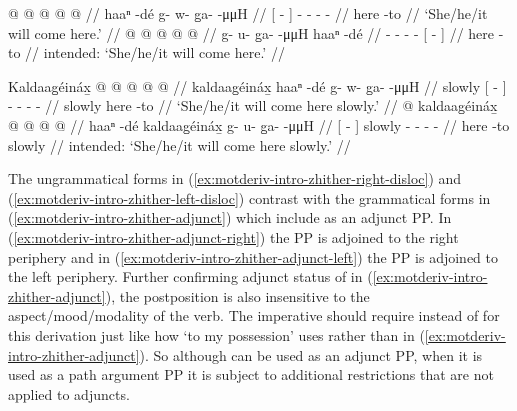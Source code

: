 \documentclass[12pt,letterpaper,oneside,article]{memoir}
\begin{document}
\pex\label{ex:motderiv-intro-zhither-right}%
\a\label{ex:motderiv-intro-zhither-right-insitu}%
%
\begingl
	\gla	{}  @ {} {}
		 @ {} @ {} @ {} @ {} //
	\glb	{} haaⁿ -dé {}
		g- w- g̱a-  -μμH //
	\glc	{}[  - {}]
		- - -  - //
	\gld	{} here -to {}
		 {} {} {} {} //
	\glft	‘She/he/it will come here.’
		//
\endgl
\a\label{ex:motderiv-intro-zhither-right-disloc}%
\ljudge{*}%
%
\begingl
	\gla	{} @ {} @ {} @ {} @ {}
		{}  @ {} {} //
	\glb	g- u- g̱a-  -μμH
		{} haaⁿ -dé {} //
	\glc	{}- - -  -
		{}[  - {}] //
	\gld	{} {} {} {} {}
		{} here -to {} //
	\glft	intended: ‘She/he/it will come here.’
		//
\endgl
\xe

\pex\label{ex:motderiv-intro-zhither-left}%
\a\label{ex:motderiv-intro-zhither-left-insitu}%
%
\begingl
	\gla	Kaldaag̱éináx̱
		{}  @ {} {}
		 @ {} @ {} @ {} @ {} //
	\glb	kaldaag̱éináx̱
		{} haaⁿ -dé {}
		g- w- g̱a-  -μμH //
	\glc	slowly
		{}[  - {}]
		- - -  - //
	\gld	slowly
		{} here -to {}
		 {} {} {} {} //
	\glft	‘She/he/it will come here slowly.’
		//
\endgl
\a\label{ex:motderiv-intro-zhither-left-disloc}%
\ljudge{*}%
%
\begingl
	\gla	{}  @ {} {}
		kaldaag̱éináx̱
		 @ {} @ {} @ {} @ {} //
	\glb	{} haaⁿ -dé {}
		kaldaag̱éináx̱
		g- u- g̱a-  -μμH //
	\glc	{}[  - {}]
		slowly
		- - -  - //
	\gld	{} here -to {}
		slowly
		 {} {} {} {} //
	\glft	intended: ‘She/he/it will come here slowly.’
		//
\endgl
\xe

The ungrammatical forms in (\ref{ex:motderiv-intro-zhither-right-disloc}) and (\ref{ex:motderiv-intro-zhither-left-disloc}) contrast with the grammatical forms in (\ref{ex:motderiv-intro-zhither-adjunct}) which include  as an adjunct PP.
In (\ref{ex:motderiv-intro-zhither-adjunct-right}) the PP  is adjoined to the right periphery and in (\ref{ex:motderiv-intro-zhither-adjunct-left}) the PP is adjoined to the left periphery.
Further confirming adjunct status of  in (\ref{ex:motderiv-intro-zhither-adjunct}), the postposition  is also insensitive to the aspect/mood/modality of the verb.
The imperative should require  instead of  for this derivation just like how  ‘to my possession’ uses  rather than  in (\ref{ex:motderiv-intro-zhither-adjunct}).
So although  can be used as an adjunct PP, when it is used as a path argument PP it is subject to additional restrictions that are not applied to adjuncts.
\end{document}
